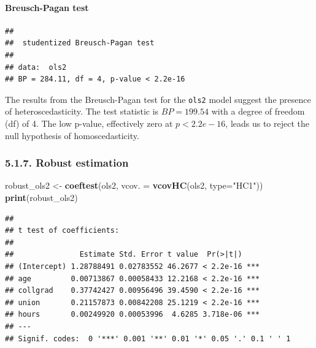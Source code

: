 \documentclass[
]{article}
\newenvironment{Shaded}{\begin{snugshade}}{\end{snugshade}}
\newcommand{\AttributeTok}[1]{\textcolor[rgb]{0.13,0.29,0.53}{#1}}
\newcommand{\FunctionTok}[1]{\textcolor[rgb]{0.13,0.29,0.53}{\textbf{#1}}}
\newcommand{\NormalTok}[1]{#1}
\newcommand{\OtherTok}[1]{\textcolor[rgb]{0.56,0.35,0.01}{#1}}
\newcommand{\StringTok}[1]{\textcolor[rgb]{0.31,0.60,0.02}{#1}}
\begin{document}
\hypertarget{breusch-pagan-test}{%
\paragraph{Breusch-Pagan test}\label{breusch-pagan-test}}

\begin{verbatim}
## 
##  studentized Breusch-Pagan test
## 
## data:  ols2
## BP = 284.11, df = 4, p-value < 2.2e-16
\end{verbatim}

The results from the Breusch-Pagan test for the \texttt{ols2} model
suggest the presence of heteroscedasticity. The test statistic is
\(BP = 199.54\) with a degree of freedom (df) of 4. The low p-value,
effectively zero at \(p < 2.2e-16\), leads us to reject the null
hypothesis of homoscedasticity.

\hypertarget{robust-estimation}{%
\subsubsection{5.1.7. Robust estimation}\label{robust-estimation}}

\begin{Shaded}
\begin{Highlighting}[]
\NormalTok{robust\_ols2 }\OtherTok{\textless{}{-}} \FunctionTok{coeftest}\NormalTok{(ols2, }\AttributeTok{vcov. =} \FunctionTok{vcovHC}\NormalTok{(ols2, }\AttributeTok{type=}\StringTok{"HC1"}\NormalTok{))}
\FunctionTok{print}\NormalTok{(robust\_ols2)}
\end{Highlighting}
\end{Shaded}

\begin{verbatim}
## 
## t test of coefficients:
## 
##               Estimate Std. Error t value  Pr(>|t|)    
## (Intercept) 1.28788491 0.02783552 46.2677 < 2.2e-16 ***
## age         0.00713867 0.00058433 12.2168 < 2.2e-16 ***
## collgrad    0.37742427 0.00956496 39.4590 < 2.2e-16 ***
## union       0.21157873 0.00842208 25.1219 < 2.2e-16 ***
## hours       0.00249920 0.00053996  4.6285 3.718e-06 ***
## ---
## Signif. codes:  0 '***' 0.001 '**' 0.01 '*' 0.05 '.' 0.1 ' ' 1
\end{verbatim}
\end{document}
